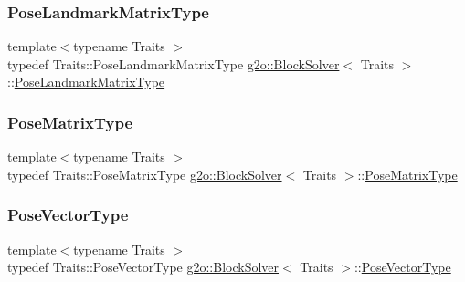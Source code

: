 \mbox{\label{classg2o_1_1_block_solver_a96bf60b923f816086cd2f24de38736ec}} 
\subsubsection{\texorpdfstring{Pose\+Landmark\+Matrix\+Type}{PoseLandmarkMatrixType}}
{\footnotesize\ttfamily template$<$typename Traits $>$ \\
typedef Traits\+::\+Pose\+Landmark\+Matrix\+Type \mbox{\hyperlink{classg2o_1_1_block_solver}{g2o\+::\+Block\+Solver}}$<$ Traits $>$\+::\mbox{\hyperlink{classg2o_1_1_block_solver_a96bf60b923f816086cd2f24de38736ec}{Pose\+Landmark\+Matrix\+Type}}}

\mbox{\label{classg2o_1_1_block_solver_a8c7c43d361bd31e3e0353889ba703bc0}} 
\subsubsection{\texorpdfstring{Pose\+Matrix\+Type}{PoseMatrixType}}
{\footnotesize\ttfamily template$<$typename Traits $>$ \\
typedef Traits\+::\+Pose\+Matrix\+Type \mbox{\hyperlink{classg2o_1_1_block_solver}{g2o\+::\+Block\+Solver}}$<$ Traits $>$\+::\mbox{\hyperlink{classg2o_1_1_block_solver_a8c7c43d361bd31e3e0353889ba703bc0}{Pose\+Matrix\+Type}}}

\mbox{\label{classg2o_1_1_block_solver_a65d51b9281e2e2597df05eb00801ee76}} 
\subsubsection{\texorpdfstring{Pose\+Vector\+Type}{PoseVectorType}}
{\footnotesize\ttfamily template$<$typename Traits $>$ \\
typedef Traits\+::\+Pose\+Vector\+Type \mbox{\hyperlink{classg2o_1_1_block_solver}{g2o\+::\+Block\+Solver}}$<$ Traits $>$\+::\mbox{\hyperlink{classg2o_1_1_block_solver_a65d51b9281e2e2597df05eb00801ee76}{Pose\+Vector\+Type}}}



